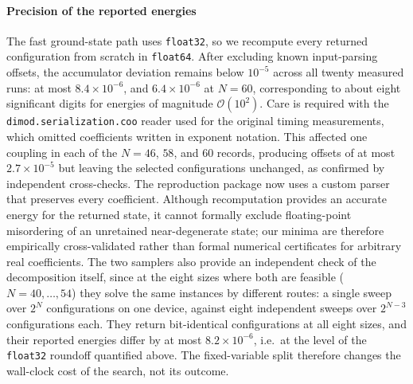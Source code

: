 \documentclass[preprint,12pt,a4paper]{elsarticle}
\begin{document}
\paragraph{Precision of the reported energies}
The fast ground-state path uses \texttt{float32}, so we recompute every returned
configuration from scratch in \texttt{float64}. After excluding known input-parsing
offsets, the accumulator deviation remains below $10^{-5}$ across all twenty
measured runs: at most $8.4\times10^{-6}$, and $6.4\times10^{-6}$ at $N=60$,
corresponding to about eight significant digits for energies of magnitude
$\mathcal{O}(10^2)$. Care is required with the \texttt{dimod.serialization.coo}
reader used for the original timing measurements, which omitted coefficients written
in exponent notation. This affected one coupling in each of the $N=46$, $58$,
and $60$ records, producing offsets of at most $2.7\times10^{-5}$ but leaving the
selected configurations unchanged, as confirmed by independent cross-checks. The
reproduction package now uses a custom parser that preserves every coefficient.
Although recomputation provides an accurate energy for the returned state,
it cannot formally exclude floating-point misordering of an unretained
near-degenerate state; our minima are therefore empirically cross-validated rather
than formal numerical certificates for arbitrary real coefficients.
The two samplers also provide an independent check of the decomposition itself,
since at the eight sizes where both are feasible ($N=40,\dots,54$) they solve the
same instances by different routes: a single sweep over $2^{N}$ configurations on
one device, against eight independent sweeps over $2^{N-3}$ configurations each.
They return bit-identical configurations at all eight sizes, and their reported
energies differ by at most $8.2\times 10^{-6}$, i.e.\ at the level of the
\texttt{float32} roundoff quantified above. The fixed-variable split therefore
changes the wall-clock cost of the search, not its outcome.
\end{document}
